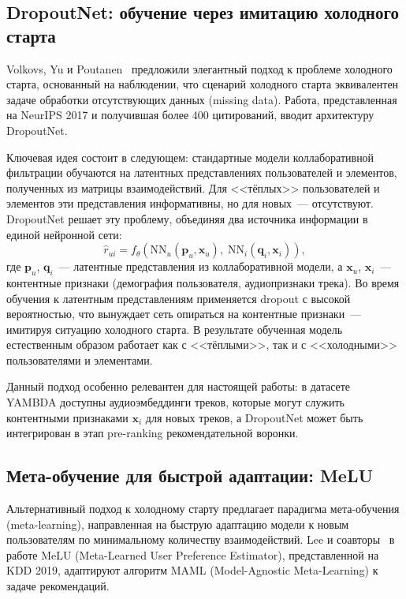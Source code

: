 \subsection{DropoutNet: обучение через имитацию холодного старта}

Volkovs, Yu и Poutanen~\cite{volkovs2017dropoutnet} предложили элегантный подход к проблеме холодного старта, основанный на наблюдении, что сценарий холодного старта эквивалентен задаче обработки отсутствующих данных (missing data). Работа, представленная на NeurIPS 2017 и получившая более 400 цитирований, вводит архитектуру DropoutNet.

Ключевая идея состоит в следующем: стандартные модели коллаборативной фильтрации обучаются на латентных представлениях пользователей и элементов, полученных из матрицы взаимодействий. Для <<тёплых>> пользователей и элементов эти представления информативны, но для новых~--- отсутствуют. DropoutNet решает эту проблему, объединяя два источника информации в единой нейронной сети:
\begin{equation}
    \hat{r}_{ui} = f_\theta\!\left(\mathrm{NN}_u(\mathbf{p}_u, \mathbf{x}_u),\; \mathrm{NN}_i(\mathbf{q}_i, \mathbf{x}_i)\right),
\end{equation}
где $\mathbf{p}_u$, $\mathbf{q}_i$~--- латентные представления из коллаборативной модели, а $\mathbf{x}_u$, $\mathbf{x}_i$~--- контентные признаки (демография пользователя, аудиопризнаки трека). Во время обучения к латентным представлениям применяется dropout с высокой вероятностью, что вынуждает сеть опираться на контентные признаки~--- имитируя ситуацию холодного старта. В результате обученная модель естественным образом работает как с <<тёплыми>>, так и с <<холодными>> пользователями и элементами.

Данный подход особенно релевантен для настоящей работы: в датасете YAMBDA доступны аудиоэмбеддинги треков, которые могут служить контентными признаками $\mathbf{x}_i$ для новых треков, а DropoutNet может быть интегрирован в этап pre-ranking рекомендательной воронки.

\subsection{Мета-обучение для быстрой адаптации: MeLU}

Альтернативный подход к холодному старту предлагает парадигма мета-обучения (meta-learning), направленная на быструю адаптацию модели к новым пользователям по минимальному количеству взаимодействий. Lee и соавторы~\cite{lee2019melu} в работе MeLU (Meta-Learned User Preference Estimator), представленной на KDD 2019, адаптируют алгоритм MAML (Model-Agnostic Meta-Learning) к задаче рекомендаций.

